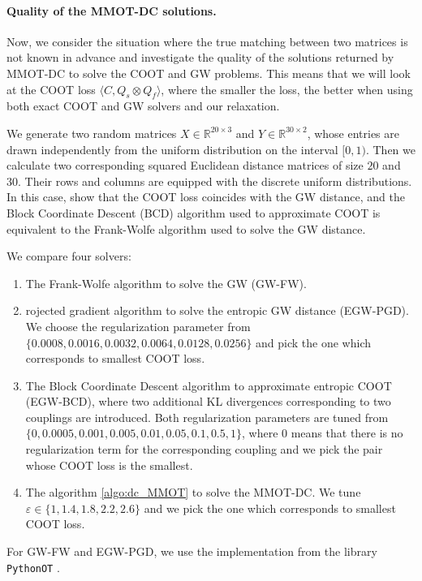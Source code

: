 \documentclass{article}
\begin{document}
\paragraph{Quality of the MMOT-DC solutions. \label{expe:2}} 


Now, we consider the situation where the true matching between two matrices is not known in advance and investigate the quality 
of the solutions returned by MMOT-DC to solve the COOT and GW problems. This means that we will look at the COOT loss 
$\langle C, Q_s \otimes Q_f \rangle$, where the smaller the loss, the better when using both exact COOT and GW solvers
and our relaxation.

We generate two random matrices $X \in \mathbb R^{20 \times 3}$ and $Y \in \mathbb R^{30 \times 2}$, 
whose entries are drawn independently from the uniform distribution on the interval $[0,1)$. Then we calculate two corresponding 
squared Euclidean distance matrices of size $20$ and $30$. Their rows and columns are equipped with the discrete 
uniform distributions. In this case, \citep{Redko20} show that the COOT loss coincides with the GW distance, and the 
Block Coordinate Descent (BCD) algorithm used to approximate COOT is equivalent to the Frank-Wolfe algorithm \citep{Frank56} 
used to solve the GW distance.

We compare four solvers:
\begin{enumerate}
  \item The Frank-Wolfe algorithm to solve the GW (GW-FW).

  \item rojected gradient algorithm to solve the entropic GW distance \cite{Peyre16} (EGW-PGD). We choose the regularization 
  parameter from $\{0.0008, 0.0016, 0.0032, 0.0064, 0.0128, 0.0256 \}$ and pick the one which corresponds to smallest COOT loss.

  \item The Block Coordinate Descent algorithm to approximate entropic COOT \cite{Redko20} 
  (EGW-BCD), where two additional KL divergences corresponding to two couplings are introduced. 
  Both regularization parameters are tuned from $\{0, 0.0005, 0.001, 0.005, 0.01, 0.05, 0.1, 0.5, 1 \}$, 
  where $0$ means that there is no regularization term for the corresponding coupling and we pick the pair whose COOT loss is the smallest.

  \item The algorithm \ref{algo:dc_MMOT} to solve the MMOT-DC. We tune 
  $\varepsilon \in \{1, 1.4, 1.8, 2.2, 2.6\}$ and we pick the one which corresponds to smallest COOT loss.
\end{enumerate}
For GW-FW and EGW-PGD, we use the implementation from the library \texttt{PythonOT} \citep{Flamary21}.
\end{document}
